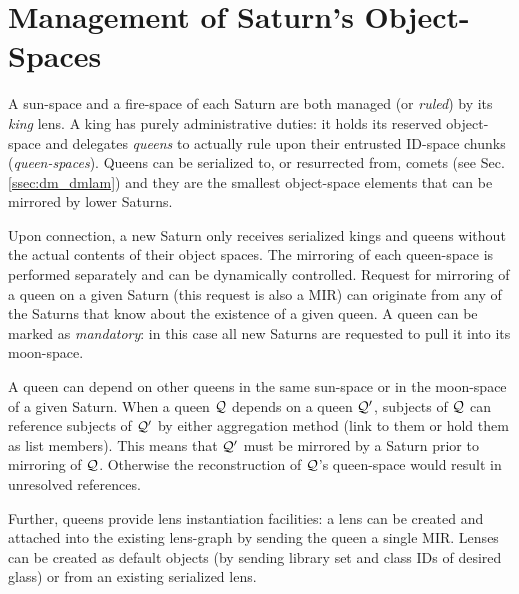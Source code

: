 \documentclass[a4paper,11pt]{article}
\begin{document}

\section{Management of Saturn's Object-Spaces}
\label{sec:saturn_os_management}

A sun-space and a fire-space of each Saturn are both managed (or
\emph{ruled}) by its \emph{king} lens. A king has purely
administrative duties: it holds its reserved object-space and
delegates \emph{queens} to actually rule upon their entrusted ID-space
chunks (\emph{queen-spaces}). Queens can be serialized to, or
resurrected from, comets (see Sec.\,\ref{ssec:dm_dmlam}) and they are
the smallest object-space elements that can be mirrored by lower
Saturns.

Upon connection, a new Saturn only receives serialized kings and
queens without the actual contents of their object spaces. The
mirroring of each queen-space is performed separately and can be
dynamically controlled. Request for mirroring of a queen on a given
Saturn (this request is also a MIR) can originate from any of the
Saturns that know about the existence of a given queen. A queen can be
marked as \emph{mandatory}: in this case all new Saturns are requested
to pull it into its moon-space.

A queen can depend on other queens in the same sun-space or in the
moon-space of a given Saturn. When a queen ${\cal Q}$ depends on a
queen ${\cal Q}'$, subjects of ${\cal Q}$ can reference subjects of
${\cal Q}'$ by either aggregation method (link to them or hold them as
list members). This means that ${\cal Q}'$ must be mirrored by a
Saturn prior to mirroring of ${\cal Q}$.  Otherwise the reconstruction
of ${\cal Q}$'s queen-space would result in unresolved references.

Further, queens provide lens instantiation facilities: a lens can be
created and attached into the existing lens-graph by sending the queen
a single MIR. Lenses can be created as default objects (by sending
library set and class IDs of desired glass) or from an existing
serialized lens.
\end{document}
